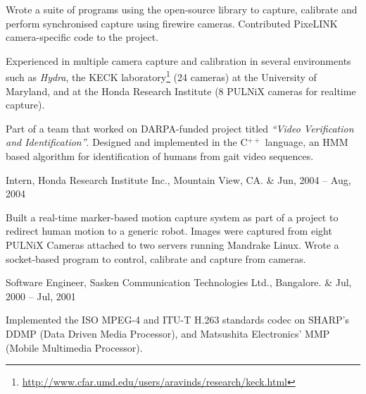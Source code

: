 \documentclass[letterpaper]{article}
\begin{document}
\begin{list1}
\begin{list2}
  \item Wrote a suite of programs using the open-source 
	library to capture, calibrate and perform synchronised capture using
	firewire cameras. Contributed PixeLINK camera-specific code to the
	 project.

  \item Experienced in multiple camera capture and calibration in several
	environments such as \emph{Hydra}, the KECK
	laboratory\footnote{\href{http://www.cfar.umd.edu/users/aravinds/research/keck.html}{http://www.cfar.umd.edu/users/aravinds/research/keck.html}} (24 cameras) at the University of Maryland, and at the Honda Research Institute (8 PULNiX cameras for realtime capture). 

  \item Part of a team that worked on DARPA-funded project titled {\em``Video
	Verification and Identification''}. Designed and implemented
	in the C$^{++}$ language, an HMM based algorithm for identification of humans 
	from gait video sequences. 

  \end{list2}
   
 \item
  \begin{tabular1bold}
   Intern, Honda Research Institute Inc., Mountain View, CA. & Jun, 2004 -- Aug, 2004\\
  \end{tabular1bold}

  \begin{list2}
   \item Built a real-time marker-based motion capture system as part of a
	 project to redirect human motion to a generic robot. Images were captured
	 from eight PULNiX Cameras attached to two servers running Mandrake Linux.
	 Wrote a socket-based program to control, calibrate and capture from 
	 cameras.
  \end{list2}
  
  \item
   \begin{tabular1bold}
	Software Engineer, Sasken Communication Technologies Ltd., Bangalore.
	& Jul, 2000 -- Jul, 2001\\
   \end{tabular1bold}

   \begin{list2}
	\item Implemented the ISO MPEG-4 and ITU-T H.263 standards codec on
	 SHARP's DDMP (Data Driven Media Processor), and Matsushita Electronics' MMP
	 (Mobile Multimedia Processor). 


\end{list2}
\end{list1}
\end{document}
